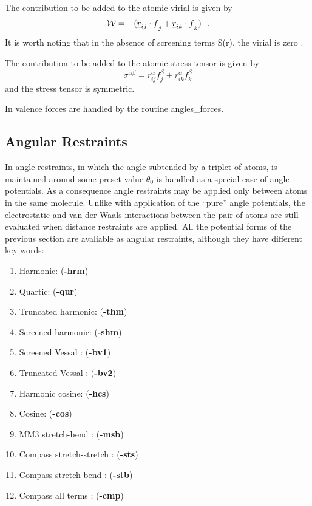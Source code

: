 The contribution to be added to the atomic virial is given by
\begin{equation}
{\cal W} = -(\mbox{$\underline{r}$}_{ij} \cdot \mbox{$\underline{f}$}_{j} + \mbox{$\underline{r}$}_{ik} \cdot
\mbox{$\underline{f}$}_{k})~~.
\end{equation}
It is worth noting that in the absence of screening terms S(r), the
virial is zero \cite{smith-93c}.

The contribution to be added to the atomic stress tensor is given by
\begin{equation}
\sigma^{\alpha \beta} = r_{ij}^{\alpha} f_{j}^{\beta} + r_{ik}^{\alpha} f_{k}^{\beta}
\end{equation}
and the stress tensor is symmetric.

In \D valence forces are handled by the routine {\sc
angles\_forces}.

\subsection{Angular Restraints}

In \D angle restraints, in which the angle subtended by a triplet
of atoms, is maintained around some preset value $\theta_{0}$ is
handled as a special case of angle potentials.  As a consequence
angle restraints may be applied only between atoms in the same
molecule.  Unlike with application of the ``pure'' angle
potentials, the electrostatic and
van der Waals interactions between
the pair of atoms are still evaluated when distance restraints are
applied.  All the potential forms of the previous section are
avaliable as angular restraints, although they have different key
words:

\begin{enumerate}
\item Harmonic:  ({\bf -hrm})
\item Quartic:  ({\bf -qur})
\item Truncated harmonic:  ({\bf -thm})
\item Screened harmonic:  ({\bf -shm})
\item Screened Vessal \cite{vessal-94a}:  ({\bf -bv1})
\item Truncated Vessal \cite{smith-95a}:  ({\bf -bv2})
\item Harmonic cosine:  ({\bf -hcs})
\item Cosine:  ({\bf -cos})
\item MM3 stretch-bend \cite{allinger-89a}:  ({\bf -msb})
\item Compass stretch-stretch \cite{sun-98a}:  ({\bf -sts})
\item Compass stretch-bend \cite{sun-98a}:  ({\bf -stb})
\item Compass all terms \cite{sun-98a}:  ({\bf -cmp})
\end{enumerate}

